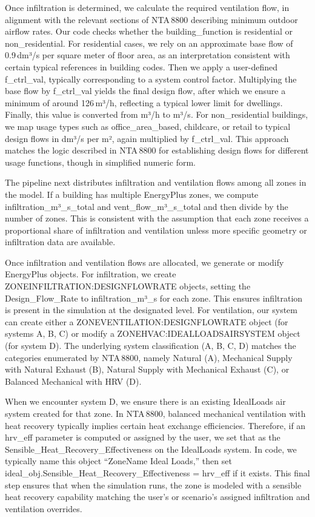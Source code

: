 Once infiltration is determined, we calculate the required ventilation flow, in alignment with the relevant sections of NTA 8800 describing minimum outdoor airflow rates. Our code checks whether the building_function is residential or non_residential. For residential cases, we rely on an approximate base flow of 0.9 dm³/s per square meter of floor area, as an interpretation consistent with certain typical references in building codes. Then we apply a user-defined f_ctrl_val, typically corresponding to a system control factor. Multiplying the base flow by f_ctrl_val yields the final design flow, after which we ensure a minimum of around 126 m³/h, reflecting a typical lower limit for dwellings. Finally, this value is converted from m³/h to m³/s. For non_residential buildings, we map usage types such as office_area_based, childcare, or retail to typical design flows in dm³/s per m², again multiplied by f_ctrl_val. This approach matches the logic described in NTA 8800 for establishing design flows for different usage functions, though in simplified numeric form.

The pipeline next distributes infiltration and ventilation flows among all zones in the model. If a building has multiple EnergyPlus zones, we compute infiltration_m³_s_total and vent_flow_m³_s_total and then divide by the number of zones. This is consistent with the assumption that each zone receives a proportional share of infiltration and ventilation unless more specific geometry or infiltration data are available.

Once infiltration and ventilation flows are allocated, we generate or modify EnergyPlus objects. For infiltration, we create ZONEINFILTRATION:DESIGNFLOWRATE objects, setting the Design_Flow_Rate to infiltration_m³_s for each zone. This ensures infiltration is present in the simulation at the designated level. For ventilation, our system can create either a ZONEVENTILATION:DESIGNFLOWRATE object (for systems A, B, C) or modify a ZONEHVAC:IDEALLOADSAIRSYSTEM object (for system D). The underlying system classification (A, B, C, D) matches the categories enumerated by NTA 8800, namely Natural (A), Mechanical Supply with Natural Exhaust (B), Natural Supply with Mechanical Exhaust (C), or Balanced Mechanical with HRV (D).

When we encounter system D, we ensure there is an existing IdealLoads air system created for that zone. In NTA 8800, balanced mechanical ventilation with heat recovery typically implies certain heat exchange efficiencies. Therefore, if an hrv_eff parameter is computed or assigned by the user, we set that as the Sensible_Heat_Recovery_Effectiveness on the IdealLoads system. In code, we typically name this object “ZoneName Ideal Loads,” then set ideal_obj.Sensible_Heat_Recovery_Effectiveness = hrv_eff if it exists. This final step ensures that when the simulation runs, the zone is modeled with a sensible heat recovery capability matching the user’s or scenario’s assigned infiltration and ventilation overrides.

